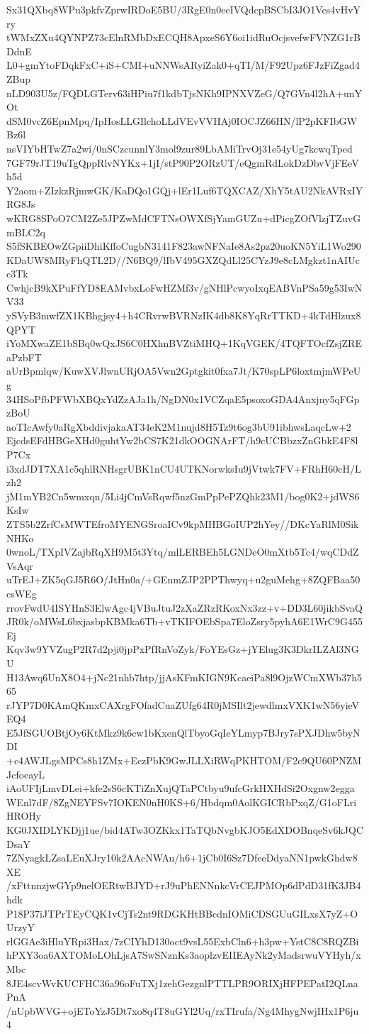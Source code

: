 Sx31QXbq8WPu3pkfvZprwIRDoE5BU/3RgE0n0eeIVQdcpBSCbI3JO1Vcs4vHvYry
tWMxZXu4QYNPZ73cElnRMbDxECQH8ApxeS6Y6oi1idRuOcjsvefwFVNZG1rBDdnE
L0+gmYtoFDqkFxC+iS+CMI+uNNWsARyiZak0+qTI/M/F92Upz6FJzFiZgad4ZBup
nLD903U5z/FQDLGTerv63iHPiu7f1kdbTjsNKh9IPNXVZeG/Q7GVn4l2hA+unYOt
dSM0vcZ6EpnMpq/IpHosLLGIlchoLLdVEvVVHAj0IOCJZ66HN/lP2pKFIbGWBz6l
nsVIYbHTwZ7a2wi/0nSCzcunnlY3mol9zur89LbAMiTrvOj31e54yUg7kcwqTped
7GF79rJT19uTgQppRlvNYKx+1jI/stP90P2ORzUT/eQgmRdLokDzDbvVjFEeVh5d
Y2aom+ZIzkzRjmwGK/KaDQo1GQj+lEr1Luf6TQXCAZ/XhY5tAU2NkAVRxIYRG8Js
wKRG8SPoO7CM2Ze5JPZwMdCFTNsOWXfSjYamGUZu+dPicgZOfVlzjTZuvGmBLC2q
S5fSKBEOwZGpiiDhiKffoCugbN3141F823awNFNaIe8As2pz20uoKN5YiL1Wo290
KDaUW8MRyFhQTL2D//N6BQ9/lIbV495GXZQdLl25CYzJ9e8cLMgkzt1nAIUcc3Tk
CwhjcB9kXPuFfYD8EAMvbxLoFwHZMf3v/gNHlPcwyoIxqEABVnPSa59g53IwNV33
ySVyB3mwfZX1KBhgjsy4+h4CRvrwBVRNzIK4db8K8YqRrTTKD+4kTdHlzux8QPYT
iYoMXwaZE1bSBq0wQxJS6C0HXhnBVZtiMHQ+1KqVGEK/4TQFTOcfZsjZREaPzbFT
aUrBpmlqw/KuwXVJlwnURjOA5Vwn2Gptgkit0fxa7Jt/K70spLP6loxtmjmWPeUg
34HSoPfbPFWbXBQxYdZzAJa1h/NgDN0x1VCZqaE5psoxoGDA4Anxjny5qFGpzBoU
aoTIcAwfy0aRgXbddivjakaAT34eK2M1nujd8H5Tz9t6og3bU91ibhwsLaqcLw+2
EjcdsEFdHBGeXHd0guhtYw2bCS7K21dkOOGNArFT/h9cUCBbzxZnGbkE4F8lP7Cx
i3xdJDT7XA1c5qhlRNHsgrUBK1nCU4UTKNorwksIu9jVtwk7FV+FRhH60cH/Lzh2
jM1mYB2Cn5wmxqn/5Li4jCmVsRqwf5nzGmPpPePZQhk23M1/bog0K2+jdWS6KsIw
ZTS5b2ZrfCsMWTEfroMYENGSroaICv9kpMHBGoIUP2hYey//DKcYaRlM0SikNHKo
0wnoL/TXpIVZajbRqXH9M5t3Ytq/mlLERBEh5LGNDeO0mXtb5Tc4/wqCDdZVsAqr
uTrEJ+ZK5qGJ5R6O/JtHn0a/+GEnmZJP2PPThwyq+u2guMehg+8ZQFBaa50csWEg
rrovFwdU4ISYHnS3ElwAgc4jVBuJtuJ2zXaZRzRKoxNx3zz+v+DD3L60jikbSvaQ
JR0k/oMWsL6bxjasbpKBMka6Tb+vTKIFOEbSpa7EloZsry5pyhA6E1WrC9G455Ej
Kqv3w9YVZugP2R7d2pji0jpPxPfRnVoZyk/FoYEsGz+jYElug3K3DkrILZAl3NGU
H13Awq6UnX8O4+jNc21nhb7htp/jjAsKFmKIGN9KcaeiPa8l9OjzWCmXWb37h565
rJYP7D0KAmQKmxCAXrgFOfadCuaZUfg64R0jMSIlt2jewdlmxVXK1wN56yieVEQ4
E5JfSGUOBtjOy6KtMkz9k6cw1bKxenQlTbyoGqIeYLmyp7BJry7sPXJDhw5byNDI
+c4AWJLgsMPCs8h1ZMx+EczPbK9GwJLLXiRWqPKHTOM/F2c9QU60PNZMJcfoeayL
iAoUFIjLmvDLei+kfe2sS6cKTiZnXujQTaPCtbyu9ufcGrkHXHdSi2Oxgnw2egga
WEnl7dF/8ZgNEYFSv7IOKEN0nH0KS+6/Hbdqm0AolKGICRbPxqZ/G1oFLriHROHy
KG0JXIDLYKDjj1ue/bid4ATw3OZKkx1TaTQbNvgbKJO5EdXDOBnqeSv6kJQCDsaY
7ZNyagkLZsaLEuXJry10k2AAcNWAu/h6+1jCb0I6Sz7DfeeDdyaNN1pwkGhdw8XE
/xFttnnzjwGYp9nelOERtwBJYD+rJ9uPhENNnkcVrCEJPMOp6dPdD31fK3JB4hdk
P18P37iJTPrTEyCQK1vCjTs2nt9RDGKHtBBcdnIOMiCDSGUuGILxsX7yZ+OUrzyY
rlGGAe3iHluYRpi3Hax/7zCIYhD130oct9vsL55ExbCln6+h3pw+YstC8C8RQZBi
hPXY3oa6AXTOMoLOhLjsA7SwSNznKs3aoplzvEIIEAyNk2yMadsrwuVYHyh/xMbc
8JE4scvWvKUCFHC36a96oFuTXj1zehGezgnlPTTLPR9ORIXjHFPEPatI2QLnaPnA
/nUpbWVG+ojEToYzJ5Dt7xo8q4T8uGYl2Uq/rxTIrufa/Ng4MhygNwjIHx1P6ju4
